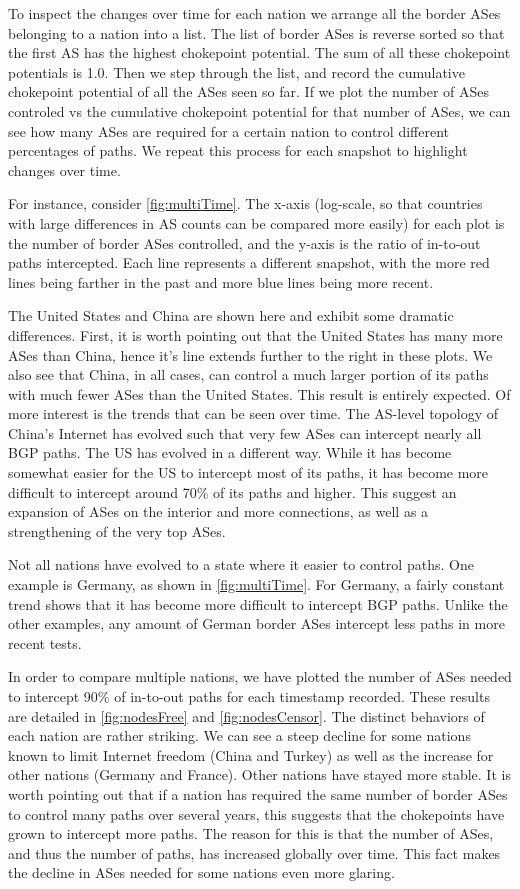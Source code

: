 To inspect the changes over time for each nation we arrange all the border ASes
belonging to a nation into a list. The list of border ASes is reverse sorted so
that the first AS has the highest chokepoint potential. The sum of all these
chokepoint potentials is 1.0. Then we step through the list, and record the
cumulative chokepoint potential of all the ASes seen so far. If we plot the
number of ASes controled vs the cumulative chokepoint potential for that number
of ASes, we can see how many ASes are required for a certain nation to control
different percentages of paths. We repeat this process for each snapshot to
highlight changes over time.

For instance, consider \figurename \ref{fig:multiTime}.  The x-axis (log-scale,
so that countries with large differences in AS counts can be compared more
easily) for each plot is the number of border ASes controlled, and the y-axis
is the ratio of in-to-out paths intercepted. Each line represents a different
snapshot, with the more red lines being farther in the past and more blue lines
being more recent.

The United States and China are shown here and exhibit some dramatic
differences. First, it is worth pointing out that the United States has many
more ASes than China, hence it's line extends further to the right in these
plots. We also see that China, in all cases, can control a much larger portion
of its paths with much fewer ASes than the United States. This result is
entirely expected. Of more interest is the trends that can be seen over time.
The AS-level topology of China's Internet has evolved such that very few ASes
can intercept nearly all BGP paths. The US has evolved in a different way.
While it has become somewhat easier for the US to intercept most of its paths,
it has become more difficult to intercept around 70\% of its paths and higher.
This suggest an expansion of ASes on the interior and more connections, as well
as a strengthening of the very top ASes.

Not all nations have evolved to a state where it easier to control paths. One
example is Germany, as shown in \figurename \ref{fig:multiTime}. For Germany, a
fairly constant trend shows that it has become more difficult to intercept BGP
paths. Unlike the other examples, any amount of German border ASes intercept
less paths in more recent tests.

In order to compare multiple nations, we have plotted the number of ASes needed
to intercept 90\% of in-to-out paths for each timestamp recorded. These results
are detailed in \figurename \ref{fig:nodesFree} and \figurename
\ref{fig:nodesCensor}.  The distinct behaviors of each nation are rather
striking. We can see a steep decline for some nations known to limit Internet
freedom (China and Turkey) as well as the increase for other nations (Germany
and France). Other nations have stayed more stable. It is worth pointing out
that if a nation has required the same number of border ASes to control many
paths over several years, this suggests that the chokepoints have grown to
intercept more paths. The reason for this is that the number of ASes, and thus
the number of paths, has increased globally over time. This fact makes the
decline in ASes needed for some nations even more glaring.


